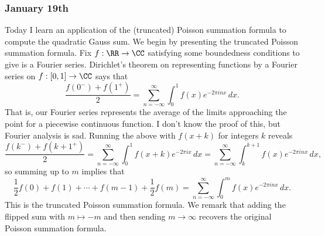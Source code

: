 \subsubsection{January 19th}
Today I learn an application of the (truncated) Poisson summation formula to compute the quadratic Gauss sum. We begin by presenting the truncated Poisson summation formula. Fix $f:\RR\to\CC$ satisfying some boundedness conditions to give is a Fourier series. Dirichlet's theorem on representing functions by a Fourier series on $f:[0,1]\to\CC$ says that
\[\frac{f(0^-)+f(1^+)}2=\sum_{n=-\infty}^\infty\int_0^1f(x)e^{-2\pi inx}\,dx.\]
That is, our Fourier series represents the average of the limits approaching the point for a piecewise continuous function. I don't know the proof of this, but Fourier analysis is sad. Running the above with $f(x+k)$ for integers $k$ reveals
\[\frac{f(k^-)+f(k+1^+)}2=\sum_{n=-\infty}^\infty\int_0^1f(x+k)e^{-2\pi ix}\,dx=\sum_{n=-\infty}^\infty\int_k^{k+1}f(x)e^{-2\pi inx}\,dx,\]
so summing up to $m$ implies that
\[\frac12f(0)+f(1)+\cdots+f(m-1)+\frac12f(m)=\sum_{n=-\infty}^\infty\int_0^mf(x)e^{-2\pi inx}\,dx.\]
This is the truncated Poisson summation formula. We remark that adding the flipped sum with $m\mapsto-m$ and then sending $m\to\infty$ recovers the original Poisson summation formula.

